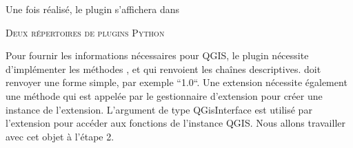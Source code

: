 Une fois réalisé, le plugin s'affichera dans

\begin{Astuce}\caption{\textsc{Deux répertoires de plugins Python}}
\end{Astuce}

Pour fournir les informations nécessaires pour QGIS, le plugin nécessite
d'implémenter les méthodes ,  et
 qui renvoient les chaînes descriptives.
 doit renvoyer une forme simple, par exemple
``1.0``. Une extension nécessite également une méthode
 qui est appelée par le gestionnaire d'extension
 pour créer une instance de l'extension. L'argument de type QGisInterface est
utilisé par l'extension pour accéder aux fonctions de l'instance QGIS. Nous allons
travailler avec cet objet à l'étape 2.

